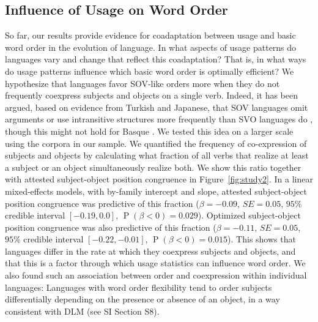\documentclass[11pt,a4paper]{article}
\begin{document}
\subsection*{Influence of Usage on Word Order}
So far, our results provide evidence for coadaptation between usage and basic word order in the evolution of language.
In what aspects of usage patterns do languages vary and change that reflect this coadaptation?
That is, in what ways do usage patterns influence which basic word order is optimally efficient?
We hypothesize that languages favor SOV-like orders more when they do not frequently coexpress subjects and objects on a single verb.
Indeed, it has been argued, based on evidence from Turkish and Japanese, that SOV languages omit arguments or use intransitive structures more frequently than SVO languages do \citep{hiranuma1999syntactic,ueno2009does,luk2014investigating}, though this might not hold for Basque \citep{pastor2013processing}.
We tested this idea on a larger scale using the corpora in our sample.
We quantified the frequency of co-expression of subjects and objects by calculating what fraction of all verbs that realize at least a subject or an object simultaneously realize both.
We show this ratio together with attested subject-object position congruence in Figure~\ref{fig:study2}.
In a linear mixed-effects models, with by-family intercept and slope, attested subject-object position congruence was predictive of this fraction ($\beta=-0.09$, $SE=0.05$, $95\%$ credible interval $[-0.19, 0.0]$, $\operatorname{P}(\beta<0) = 0.029$). %
Optimized subject-object position congruence was also predictive of this fraction ($\beta=-0.11$, $SE=0.05$, $95\%$ credible interval $[-0.22,  -0.01]$, $\operatorname{P}(\beta<0) = 0.015$). %
This shows that languages differ in the rate at which they coexpress subjects and objects, and that this is a factor through which usage statistics can influence word order.
We also found such an association between order and coexpression within individual languages: Languages with word order flexibility tend to order subjects differentially depending on the presence or absence of an object, in a way consistent with DLM (see SI Section S8).

\end{document}

